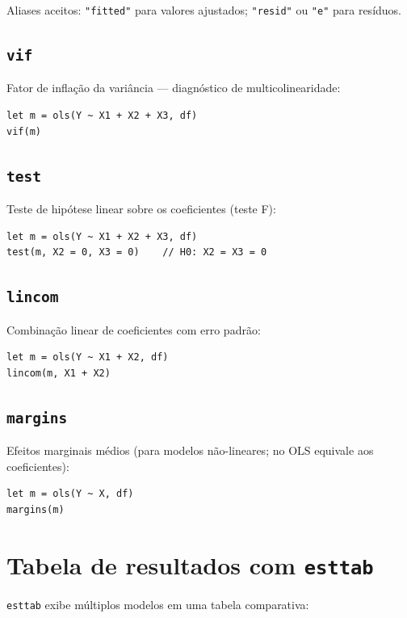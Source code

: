 Aliases aceitos: \texttt{"fitted"} para valores ajustados; \texttt{"resid"} ou
\texttt{"e"} para resíduos.

\subsection{\texttt{vif}}

Fator de inflação da variância — diagnóstico de multicolinearidade:

\begin{lstlisting}
let m = ols(Y ~ X1 + X2 + X3, df)
vif(m)
\end{lstlisting}

\subsection{\texttt{test}}

Teste de hipótese linear sobre os coeficientes (teste F):

\begin{lstlisting}
let m = ols(Y ~ X1 + X2 + X3, df)
test(m, X2 = 0, X3 = 0)    // H0: X2 = X3 = 0
\end{lstlisting}

\subsection{\texttt{lincom}}

Combinação linear de coeficientes com erro padrão:

\begin{lstlisting}
let m = ols(Y ~ X1 + X2, df)
lincom(m, X1 + X2)
\end{lstlisting}

\subsection{\texttt{margins}}

Efeitos marginais médios (para modelos não-lineares; no OLS equivale aos coeficientes):

\begin{lstlisting}
let m = ols(Y ~ X, df)
margins(m)
\end{lstlisting}

\section{Tabela de resultados com \texttt{esttab}}

\lstinline{esttab} exibe múltiplos modelos em uma tabela comparativa:

